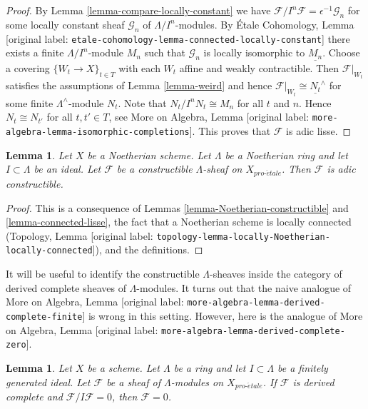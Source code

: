 \documentclass[10pt,a4paper]{article}
\theoremstyle{plain}
\newtheorem{lemma}[subsection]{Lemma}
\theoremstyle{definition}
\theoremstyle{remark}
\numberwithin{equation}{subsection}
\def\proetale{{pro\text{-}\acute{e}tale}}
\begin{document}
\begin{proof}
By Lemma \ref{lemma-compare-locally-constant} we have
$\mathcal{F}/I^n\mathcal{F} = \epsilon^{-1}\mathcal{G}_n$
for some locally constant sheaf $\mathcal{G}_n$ of $\Lambda/I^n$-modules. By
\'Etale Cohomology, Lemma
[original label: \nolinkurl{etale-cohomology-lemma-connected-locally-constant}]
there exists a finite $\Lambda/I^n$-module $M_n$ such that
$\mathcal{G}_n$ is locally isomorphic to $\underline{M_n}$.
Choose a covering $\{W_t \to X\}_{t \in T}$ with each $W_t$
affine and weakly contractible.
Then $\mathcal{F}|_{W_t}$ satisfies the assumptions of
Lemma \ref{lemma-weird}
and hence $\mathcal{F}|_{W_t} \cong \underline{N_t}^\wedge$
for some finite $\Lambda^\wedge$-module $N_t$. Note that
$N_t/I^nN_t \cong M_n$ for all $t$ and $n$. Hence
$N_t \cong N_{t'}$ for all $t, t' \in T$, see
More on Algebra, Lemma [original label: \nolinkurl{more-algebra-lemma-isomorphic-completions}].
This proves that $\mathcal{F}$ is adic lisse.
\end{proof}

\begin{lemma}
\label{lemma-Noetherian-adic-constructible}
Let $X$ be a Noetherian scheme. Let $\Lambda$ be a Noetherian ring and
let $I \subset \Lambda$ be an ideal. Let $\mathcal{F}$ be a
constructible $\Lambda$-sheaf on $X_\proetale$. Then $\mathcal{F}$
is adic constructible.
\end{lemma}

\begin{proof}
This is a consequence of Lemmas \ref{lemma-Noetherian-constructible} and
\ref{lemma-connected-lisse}, the fact that a Noetherian scheme
is locally connected
(Topology, Lemma [original label: \nolinkurl{topology-lemma-locally-Noetherian-locally-connected}]),
and the definitions.
\end{proof}

\noindent
It will be useful to identify the constructible $\Lambda$-sheaves
inside the category of derived complete sheaves of $\Lambda$-modules.
It turns out that the naive analogue of
More on Algebra, Lemma [original label: \nolinkurl{more-algebra-lemma-derived-complete-finite}]
is wrong in this setting. However, here
is the analogue of More on Algebra, Lemma
[original label: \nolinkurl{more-algebra-lemma-derived-complete-zero}].

\begin{lemma}
\label{lemma-derived-complete-zero}
Let $X$ be a scheme. Let $\Lambda$ be a ring and let
$I \subset \Lambda$ be a finitely generated ideal.
Let $\mathcal{F}$ be a sheaf of $\Lambda$-modules on $X_\proetale$.
If $\mathcal{F}$ is derived complete and $\mathcal{F}/I\mathcal{F} = 0$,
then $\mathcal{F} = 0$.
\end{lemma}
\end{document}
